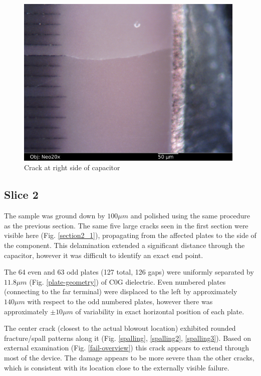 \documentclass{article}
\begin{document}
\begin{figure}[h]
\includegraphics[width=11cm,keepaspectratio]{section1_06_df_neo20x_annotated.jpg}
\caption{Crack at right side of capacitor}
\label{cracks2}
\end{figure}

\FloatBarrier

\subsection{Slice 2}

The sample was ground down by $100 \mu m$ and polished using the same procedure as the previous section. The same five
large cracks seen in the first section were visible here (Fig. \ref{section2_1}), propagating from the affected plates
to the side of the component. This delamination extended a significant distance through the capacitor, however it was
difficult to identify an exact end point.

The 64 even and 63 odd plates (127 total, 126 gaps) were uniformly separated by $11.8 \mu m$ (Fig.
\ref{plate-geometry}) of C0G dielectric. Even numbered plates (connecting to the far terminal) were displaced to the
left by approximately $140 \mu m$ with respect to the odd numbered plates, however there was approximately
$\pm 10 \mu m$ of variability in exact horizontal position of each plate.

The center crack (closest to the actual blowout location) exhibited rounded fracture/spall patterns along it (Fig.
\ref{spalling}, \ref{spalling2}, \ref{spalling3}). Based on external examination (Fig. \ref{fail-overview}) this crack
appears to extend through most of the device. The damage appears to be more severe than the other cracks, which is
consistent with its location close to the externally visible failure.
\end{document}
